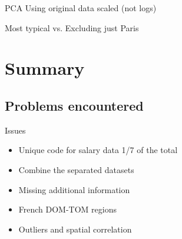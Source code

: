 \documentclass[12pt]{beamer}
\begin{document}
\begin{frame}{\textcolor{bscuro}{PCA}}
	Using original data scaled (not logs)
	
	Most typical vs. Excluding just Paris
	\begin{figure} 
		\centering
	\end{figure}
\end{frame}


\section{Summary}


\subsection{Problems encountered}


\begin{frame}{\textcolor{bscuro}{Issues}}
	\begin{itemize}
		\item Unique code for salary data 1/7 of the total 
		\item Combine the separated datasets
		\item Missing additional information 
		\item French DOM-TOM regions
		\item Outliers and spatial correlation
	\end{itemize}
\end{frame}			
\end{document}

